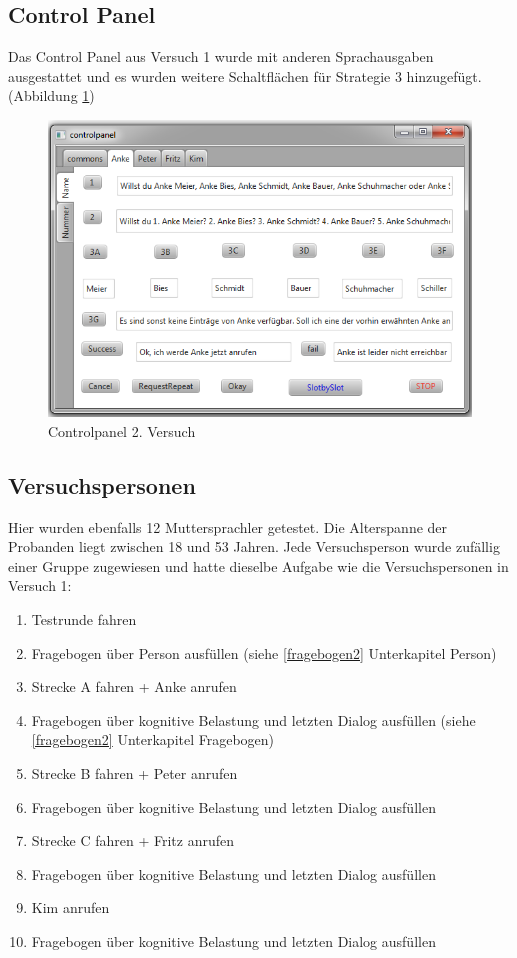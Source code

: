 \documentclass[12pt,a4paper]{scrartcl}
\begin{document}
\subsection{Control Panel}
Das Control Panel aus Versuch 1 wurde mit anderen Sprachausgaben ausgestattet und es wurden weitere Schaltflächen für Strategie 3 hinzugefügt. (Abbildung \ref{cp2})
\begin{figure}[H]
\includegraphics[width=13cm]{controlpanel2.png}
\caption{Controlpanel 2. Versuch}
\label{cp2}
\end{figure}


\subsection{Versuchspersonen}

Hier wurden ebenfalls 12 Muttersprachler getestet. Die Alterspanne der Probanden liegt zwischen 18 und 53 Jahren. Jede Versuchsperson wurde zufällig einer Gruppe zugewiesen und hatte dieselbe Aufgabe wie die Versuchspersonen in Versuch 1: 
\begin{enumerate}
\item Testrunde fahren
\item Fragebogen über Person ausfüllen (siehe \ref{fragebogen2} Unterkapitel Person)
\item Strecke A fahren + Anke anrufen
\item Fragebogen über kognitive Belastung und letzten Dialog ausfüllen (siehe \ref{fragebogen2} Unterkapitel Fragebogen)
\item Strecke B fahren + Peter anrufen
\item Fragebogen über kognitive Belastung und letzten Dialog ausfüllen
\item Strecke C fahren + Fritz anrufen
\item Fragebogen über kognitive Belastung und letzten Dialog ausfüllen 
\item Kim anrufen
\item Fragebogen über kognitive Belastung und letzten Dialog ausfüllen 
\end{enumerate}
\end{document}
